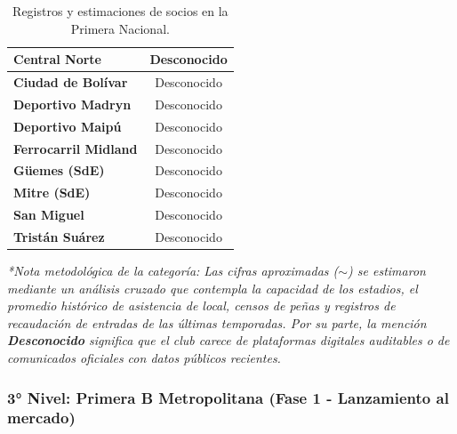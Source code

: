 \begin{table}[h!]
\begin{tabularx}{\textwidth}{|X|c|}
\textbf{Central Norte} & Desconocido \\ \hline
\textbf{Ciudad de Bolívar} & Desconocido \\ \hline
\textbf{Deportivo Madryn} & Desconocido \\ \hline
\textbf{Deportivo Maipú} & Desconocido \\ \hline
\textbf{Ferrocarril Midland} & Desconocido \\ \hline
\textbf{Güemes (SdE)} & Desconocido \\ \hline
\textbf{Mitre (SdE)} & Desconocido \\ \hline
\textbf{San Miguel} & Desconocido \\ \hline
\textbf{Tristán Suárez} & Desconocido \\ \hline
\end{tabularx}
\caption{Registros y estimaciones de socios en la Primera Nacional.}
\label{tab:anexo_primera_nacional}
\end{table}

\textit{*Nota metodológica de la categoría: Las cifras aproximadas ($\sim$) se estimaron mediante un análisis cruzado que contempla la capacidad de los estadios, el promedio histórico de asistencia de local, censos de peñas y registros de recaudación de entradas de las últimas temporadas. Por su parte, la mención \textbf{Desconocido} significa que el club carece de plataformas digitales auditables o de comunicados oficiales con datos públicos recientes.}

\newpage

\subsubsection{3° Nivel: Primera B Metropolitana (Fase 1 - Lanzamiento al mercado)}

